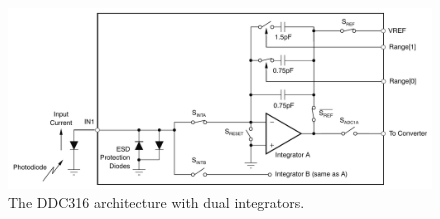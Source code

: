 \begin{figure}[!ht]
	\begin{center}
		\includegraphics[width=\textwidth]{04_IPHI_Test/figures/fig000_DDC316}
	\end{center}
	\caption[The DDC316 architecture with dual integrators]{The DDC316 architecture with dual integrators.}
	\label{chap4:DDC316}
\end{figure}
